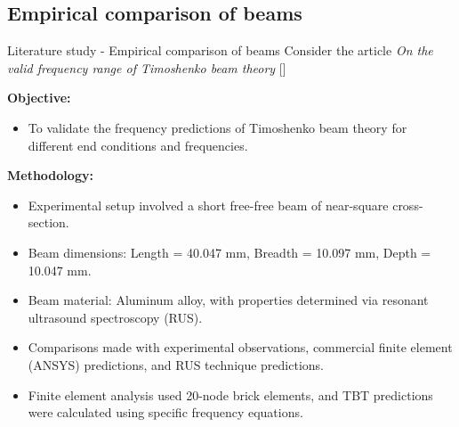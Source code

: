 \documentclass[8pt]{beamer}
\begin{document}
    \subsection{Empirical comparison of beams}
        \begin{frame}{Literature study - Empirical comparison of beams}
            Consider the article \textit{On the valid frequency range of Timoshenko beam theory} [\cite{SP06}]

            \textbf{Objective:}
            \begin{itemize}
                \item To validate the frequency predictions of Timoshenko beam theory for different end conditions and frequencies.
            \end{itemize}
        
            \textbf{Methodology:}
            \begin{itemize}
                \item Experimental setup involved a short free-free beam of near-square cross-section.
                \item Beam dimensions: Length = 40.047 mm, Breadth = 10.097 mm, Depth = 10.047 mm.
                \item Beam material: Aluminum alloy, with properties determined via resonant ultrasound spectroscopy (RUS).
                \item Comparisons made with experimental observations, commercial finite element (ANSYS) predictions, and RUS technique predictions.
                \item Finite element analysis used 20-node brick elements, and TBT predictions were calculated using specific frequency equations.
            \end{itemize}

        \end{frame}
\end{document}
